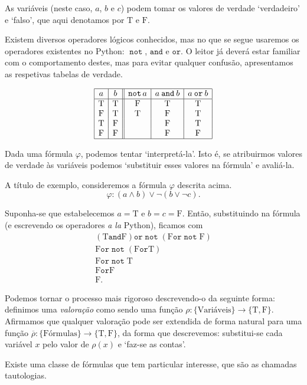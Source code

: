 \documentclass{report}
\theoremstyle{definition}
\theoremstyle{remark}
\newcommand{\lt}{\mathrm{T}}
\newcommand{\lf}{\mathrm{F}}
\DeclareMathOperator{\pnot}{\texttt{not}}
\newcommand{\pand}{\mathbin{\texttt{and}}}
\newcommand{\por}{\mathbin{\texttt{or}}}
\begin{document}
	As variáveis (neste caso, $a$, $b$ e $c$) podem tomar os valores de verdade `verdadeiro' e `falso', que aqui denotamos por $\lt$ e $\lf$.
	
	Existem diversos operadores lógicos conhecidos, mas no que se segue usaremos os operadores existentes no Python: $\pnot$, $\pand$ e $\por$. O leitor já deverá estar familiar com o comportamento destes, mas para evitar qualquer confusão, apresentamos as respetivas tabelas de verdade.
	
	\[\label{tabela:operadores}
	\begin{array}{|c|c||c|c|c|}
	\hline
	a & b & \pnot a & a \pand b & a \por b\\
	\hline
	\lt & \lt & \lf & \lt & \lt\\
	\lf & \lt & \lt & \lf & \lt\\
	\lt & \lf &     & \lf & \lt\\
	\lf & \lf &     & \lf & \lf\\
	\hline
	\end{array}
	\]
	
	Dada uma fórmula $\varphi$, podemos tentar `interpretá-la'. Isto é, se atribuirmos valores de verdade às variáveis podemos `substituir esses valores na fórmula' e avaliá-la.
	
	A título de exemplo, consideremos a fórmula $\varphi$ descrita acima.
	\[\varphi : (a \land b) \lor \neg (b \lor \neg c).\]
	
	Suponha-se que estabelecemos $a = \lt$ e $b = c = \lf$. Então, substituindo na fórmula (e escrevendo os operadores \textit{a la} Python), ficamos com
	\begin{gather*}
	(\lt \pand \lf) \por \pnot (\lf \por \pnot \lf)\\
	\lf \por \pnot (\lf \por \lt)\\
	\lf \por \pnot \lt\\
	\lf \por \lf\\
	\lf.
	\end{gather*}
	
	Podemos tornar o processo mais rigoroso descrevendo-o da seguinte forma: definimos uma \emph{valoração} como sendo uma função $\rho : \{\text{Variáveis}\} \to \{\lt, \lf\}$. Afirmamos que qualquer valoração pode ser extendida de forma natural para uma função ${\overline\rho : \{\text{Fórmulas}\} \to \{\lt, \lf\}}$, da forma que descrevemos: substitui-se cada variável $x$ pelo valor de $\rho(x)$ e `faz-se as contas'.
	
	Existe uma classe de fórmulas que tem particular interesse, que são as chamadas tautologias.
	
\end{document}
